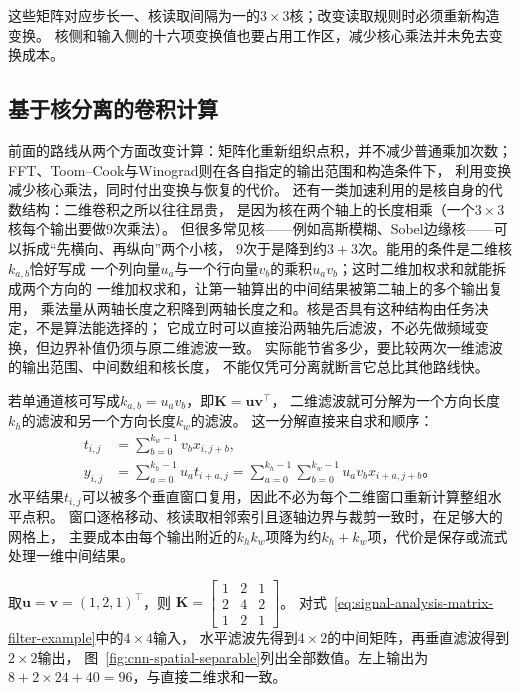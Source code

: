 这些矩阵对应步长一、核读取间隔为一的$3\times3$核；改变读取规则时必须重新构造变换。
核侧和输入侧的十六项变换值也要占用工作区，减少核心乘法并未免去变换成本。

\subsection{基于核分离的卷积计算}\label{sec:signal-analysis-fast-separable}
\label{sec:cnn-separable-implementation}

前面的路线从两个方面改变计算：矩阵化重新组织点积，并不减少普通乘加次数；
FFT、Toom--Cook与Winograd则在各自指定的输出范围和构造条件下，
利用变换减少核心乘法，同时付出变换与恢复的代价。
还有一类加速利用的是核自身的代数结构：二维卷积之所以往往昂贵，
是因为核在两个轴上的长度相乘（一个$3\times3$核每个输出要做$9$次乘法）。
但很多常见核——例如高斯模糊、Sobel边缘核——可以拆成“先横向、再纵向”两个小核，
$9$次于是降到约$3+3$次。能用的条件是二维核$k_{a,b}$恰好写成
一个列向量$u_a$与一个行向量$v_b$的乘积$u_av_b$；这时二维加权求和就能拆成两个方向的
一维加权求和，让第一轴算出的中间结果被第二轴上的多个输出复用，
乘法量从两轴长度之积降到两轴长度之和。核是否具有这种结构由任务决定，不是算法能选择的；
它成立时可以直接沿两轴先后滤波，不必先做频域变换，但边界补值仍须与原二维滤波一致。
实际能节省多少，要比较两次一维滤波的输出范围、中间数组和核长度，
不能仅凭可分离就断言它总比其他路线快。

若单通道核可写成$k_{a,b}=u_a v_b$，即$\bm K=\bm u\bm v^\top$，
二维滤波就可分解为一个方向长度$k_h$的滤波和另一个方向长度$k_w$的滤波。
这一分解直接来自求和顺序：
\begin{equation}
  \begin{aligned}
    t_{i,j}&=\sum_{b=0}^{k_w-1}v_bx_{i,j+b},\\
    y_{i,j}&=\sum_{a=0}^{k_h-1}u_at_{i+a,j}
      =\sum_{a=0}^{k_h-1}\sum_{b=0}^{k_w-1}
          u_av_bx_{i+a,j+b}\text{。}
  \end{aligned}
  \label{eq:cnn-spatial-separable-derivation}
\end{equation}
水平结果$t_{i,j}$可以被多个垂直窗口复用，因此不必为每个二维窗口重新计算整组水平点积。
窗口逐格移动、核读取相邻索引且逐轴边界与裁剪一致时，在足够大的网格上，
主要成本由每个输出附近的$k_hk_w$项降为约$k_h+k_w$项，代价是保存或流式处理一维中间结果。

取$\bm u=\bm v=(1,2,1)^\top$，则
$\bm K=\left[\begin{smallmatrix}1&2&1\\2&4&2\\1&2&1\end{smallmatrix}\right]$。
对式~\eqref{eq:signal-analysis-matrix-filter-example}中的$4\times4$输入，
水平滤波先得到$4\times2$的中间矩阵，再垂直滤波得到$2\times2$输出，
图~\ref{fig:cnn-spatial-separable}列出全部数值。左上输出为
$8+2\times24+40=96$，与直接二维求和一致。

